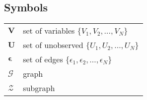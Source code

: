 \documentclass[main=english,12pt,a4paper,pdftex,econ,utf8]{aaltothesis}
\newcommand{\z}{\mathcal{Z}}
\newcommand{\g}{\mathcal{G}}
\newcommand{\e}{\bm{\epsilon}}
\newcommand{\vars}{\bm{V}}
\newcommand{\unobs}{\bm{U}}
\begin{document}
\begin{comment}
\newpage
%
\thesistitle{Opinnäyteohje}
\advisor{TkT Olli Ohjaaja}
\degreeprogram{Electronics and electrical engineering}
\department{Radiotieteen ja -tekniikan laitos}
\professorship{Piiriteoria}
\keywords{Vastus, Resistanssi,\\ Lämpötila}
\begin{abstractpage}[finnish]
  Tiivistelmässä on lyhyt selvitys (noin 100 sanaa)
  kirjoituksen tärkeimmästä sisällöstä: mitä ja miten on tutkittu,
  sekä mitä tuloksia on saatu. 
  Tiivistelmässä on lyhyt selvitys (noin 100 sanaa)
  kirjoituksen tärkeimmästä sisällöstä: mitä ja miten on tutkittu,
  sekä mitä tuloksia on saatu. 

  Tiivistelmässä on lyhyt selvitys (noin 100 sanaa)
  kirjoituksen tärkeimmästä sisällöstä: mitä ja miten on tutkittu,
  sekä mitä tuloksia on saatu. 
  Tiivistelmässä on lyhyt selvitys (noin 100 sanaa)
  kirjoituksen tärkeimmästä sisällöstä: mitä ja miten on tutkittu,
  sekä mitä tuloksia on saatu. 
  Tiivistelmässä on lyhyt selvitys (noin 100 sanaa)
  kirjoituksen tärkeimmästä sisällöstä: mitä ja miten on tutkittu,
  sekä mitä tuloksia on saatu. 
\end{abstractpage}

\end{comment}
\newpage
%

{
\hypersetup{linkcolor=black}
\thesistableofcontents
}


\subsection*{Symbols}

\begin{tabular}{ll}
$\vars$ & set of variables $\{V_{1},V_{2},\ldots,V_{N}\}$ \\
$\unobs$ & set of unobserved $\{U_{1},U_{2},\ldots,U_{N}\}$ \\
$\e$ & set of edges $\{\epsilon_{1},\epsilon_{2},\ldots,\epsilon_{N}\}$ \\
$\g$ & graph \\
$\z$ & subgraph
\end{tabular}
\end{document}

